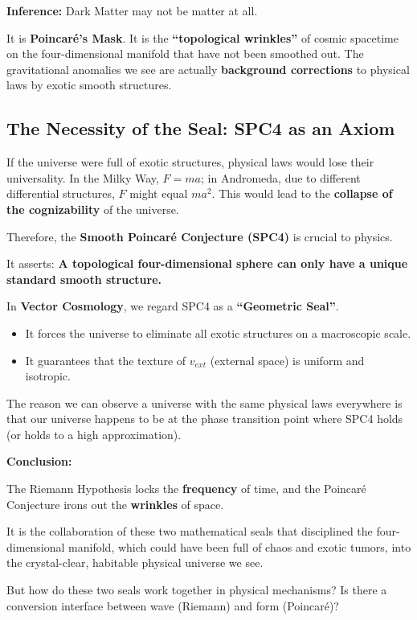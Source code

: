 \documentclass[11pt,a4paper,twoside]{book}
\begin{document}
\textbf{Inference:} Dark Matter may not be matter at all.

It is \textbf{Poincaré's Mask}. It is the \textbf{``topological wrinkles''} of cosmic spacetime on the four-dimensional manifold that have not been smoothed out. The gravitational anomalies we see are actually \textbf{background corrections} to physical laws by exotic smooth structures.

\subsection{The Necessity of the Seal: SPC4 as an Axiom}

If the universe were full of exotic structures, physical laws would lose their universality. In the Milky Way, $F=ma$; in Andromeda, due to different differential structures, $F$ might equal $ma^2$. This would lead to the \textbf{collapse of the cognizability} of the universe.

Therefore, the \textbf{Smooth Poincaré Conjecture (SPC4)} is crucial to physics.

It asserts: \textbf{A topological four-dimensional sphere can only have a unique standard smooth structure.}

In \textbf{Vector Cosmology}, we regard SPC4 as a \textbf{``Geometric Seal''}.

\begin{itemize}
\item It forces the universe to eliminate all exotic structures on a macroscopic scale.

\item It guarantees that the texture of $v_{ext}$ (external space) is uniform and isotropic.
\end{itemize}

The reason we can observe a universe with the same physical laws everywhere is that our universe happens to be at the phase transition point where SPC4 holds (or holds to a high approximation).

\textbf{Conclusion:}

The Riemann Hypothesis locks the \textbf{frequency} of time, and the Poincaré Conjecture irons out the \textbf{wrinkles} of space.

It is the collaboration of these two mathematical seals that disciplined the four-dimensional manifold, which could have been full of chaos and exotic tumors, into the crystal-clear, habitable physical universe we see.

But how do these two seals work together in physical mechanisms? Is there a conversion interface between wave (Riemann) and form (Poincaré)?
\end{document}
